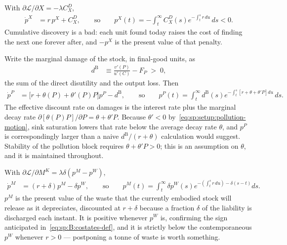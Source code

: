  With $\partial\mathcal L/\partial X=-\lambda C^D_X$,
\begin{align}
\dot p^X &= r\,p^X+C^D_X,
\qquad\text{so}\qquad
p^X\left(t\right) = -\int_t^\infty C^D_X\!\left(s\right)e^{-\int_t^s r\,du}\,ds<0 .
\label{eq:sp:B:costate:X}
\end{align}
Cumulative discovery is a bad: each unit found today raises the cost of finding the next one forever
after, and $-p^X$ is the present value of that penalty.

 Write the marginal damage of the stock, in final-good units, as
\begin{align}
d^{\mathrm B} &\equiv \frac{v'\!\left(P\right)}{u'\!\left(C\right)}-F_P\;>\;0,
\label{eq:sp:B:damage}
\end{align}
the sum of the direct disutility and the output loss. Then
\begin{align}
\dot p^P &= \Big[r+\theta\!\left(P\right)+\theta'\!\left(P\right)P\Big]p^P-d^{\mathrm B},
\qquad\text{so}\qquad
p^P\left(t\right)=\int_t^\infty d^{\mathrm B}\left(s\right)e^{-\int_t^s\left[r+\theta+\theta'P\right]du}\,ds .
\label{eq:sp:B:costate:P}
\end{align}
The effective discount rate on damages is the interest rate plus the marginal decay rate
$\partial\left[\theta(P)P\right]/\partial P=\theta+\theta'P$. Because $\theta'<0$
by~\eqref{eq:sp:setup:pollution-motion}, sink saturation lowers that rate below the average decay rate
$\theta$, and $p^P$ is correspondingly larger than a naive $d^{\mathrm B}/\left(r+\theta\right)$ calculation would
suggest. Stability of the pollution block requires $\theta+\theta'P>0$; this is an assumption on
$\theta$, and it is maintained throughout.

 With $\partial\mathcal L/\partial M^K=\lambda\delta\left(p^M-p^W\right)$,
\begin{align}
\dot p^M &= \left(r+\delta\right)p^M-\delta p^W,
\qquad\text{so}\qquad
p^M\left(t\right)=\int_t^\infty \delta p^W\!\left(s\right)
e^{-\left(\int_t^s r\,du\right)-\delta\left(s-t\right)}ds .
\label{eq:sp:B:costate:M}
\end{align}
$p^M$ is the present value of the waste that the currently embodied stock will release as it
depreciates, discounted at $r+\delta$ because a fraction $\delta$ of the liability is discharged each
instant. It is positive whenever $p^W$ is, confirming the sign anticipated
in~\eqref{eq:sp:B:costates-def}, and it is strictly below the contemporaneous $p^W$ whenever $r>0$ ---
postponing a tonne of waste is worth something.


